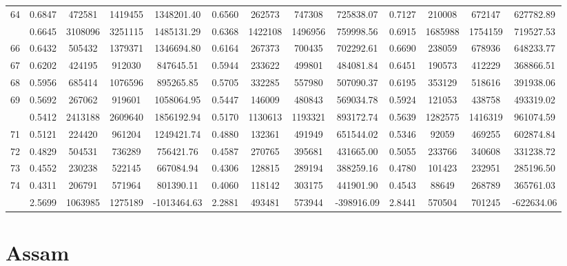 \documentclass[
  12pt,
]{article}
\begin{document}
\begin{longtable}[t]{lcccccccccccc}
64 & 0.6847 & 472581 & 1419455 & 1348201.40 & 0.6560 & 262573 & 747308 & 725838.07 & 0.7127 & 210008 & 672147 & 627782.89\\
\addlinespace
65 & 0.6645 & 3108096 & 3251115 & 1485131.29 & 0.6368 & 1422108 & 1496956 & 759998.56 & 0.6915 & 1685988 & 1754159 & 719527.53\\
66 & 0.6432 & 505432 & 1379371 & 1346694.80 & 0.6164 & 267373 & 700435 & 702292.61 & 0.6690 & 238059 & 678936 & 648233.77\\
67 & 0.6202 & 424195 & 912030 & 847645.51 & 0.5944 & 233622 & 499801 & 484081.84 & 0.6451 & 190573 & 412229 & 368866.51\\
68 & 0.5956 & 685414 & 1076596 & 895265.85 & 0.5705 & 332285 & 557980 & 507090.37 & 0.6195 & 353129 & 518616 & 391938.06\\
69 & 0.5692 & 267062 & 919601 & 1058064.95 & 0.5447 & 146009 & 480843 & 569034.78 & 0.5924 & 121053 & 438758 & 493319.02\\
\addlinespace
70 & 0.5412 & 2413188 & 2609640 & 1856192.94 & 0.5170 & 1130613 & 1193321 & 893172.74 & 0.5639 & 1282575 & 1416319 & 961074.59\\
71 & 0.5121 & 224420 & 961204 & 1249421.74 & 0.4880 & 132361 & 491949 & 651544.02 & 0.5346 & 92059 & 469255 & 602874.84\\
72 & 0.4829 & 504531 & 736289 & 756421.76 & 0.4587 & 270765 & 395681 & 431665.00 & 0.5055 & 233766 & 340608 & 331238.72\\
73 & 0.4552 & 230238 & 522145 & 667084.94 & 0.4306 & 128815 & 289194 & 388259.16 & 0.4780 & 101423 & 232951 & 285196.50\\
74 & 0.4311 & 206791 & 571964 & 801390.11 & 0.4060 & 118142 & 303175 & 441901.90 & 0.4543 & 88649 & 268789 & 365761.03\\
\addlinespace
75 & 2.5699 & 1063985 & 1275189 & -1013464.63 & 2.2881 & 493481 & 573944 & -398916.09 & 2.8441 & 570504 & 701245 & -622634.06\\*
\end{longtable}
\endgroup{}

\pagebreak

\hypertarget{assam}{%
\section{Assam}\label{assam}}

\begingroup\fontsize{9.7}{11.7}\selectfont
\end{document}
